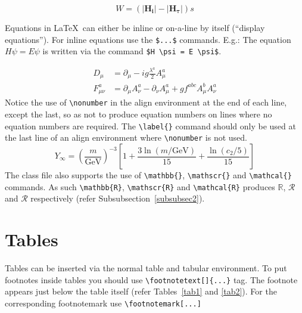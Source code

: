 \documentclass[sn-mathphys]{sn-jnl}%
\begin{document}
\begin{equation}
  W =   \left( \left| \boldsymbol{H_{i}} \right| - \left|  \boldsymbol{H_{\tau}} \right| \right)s  \label{cadentialGravityEq}
\end{equation}



Equations in \LaTeX\ can either be inline or on-a-line by itself (``display equations''). For
inline equations use the \verb+$...$+ commands. E.g.: The equation
$H\psi = E \psi$ is written via the command \verb+$H \psi = E \psi$+.

\begin{align}
D_\mu &=  \partial_\mu - ig \frac{\lambda^a}{2} A^a_\mu \nonumber \\
F^a_{\mu\nu} &= \partial_\mu A^a_\nu - \partial_\nu A^a_\mu + g f^{abc} A^b_\mu A^a_\nu \label{eq2}
\end{align}
Notice the use of \verb+\nonumber+ in the align environment at the end
of each line, except the last, so as not to produce equation numbers on
lines where no equation numbers are required. The \verb+\label{}+ command
should only be used at the last line of an align environment where
\verb+\nonumber+ is not used.
\begin{equation}
Y_\infty = \left( \frac{m}{\textrm{GeV}} \right)^{-3}
    \left[ 1 + \frac{3 \ln(m/\textrm{GeV})}{15}
    + \frac{\ln(c_2/5)}{15} \right]
\end{equation}
The class file also supports the use of \verb+\mathbb{}+, \verb+\mathscr{}+ and
\verb+\mathcal{}+ commands. As such \verb+\mathbb{R}+, \verb+\mathscr{R}+
and \verb+\mathcal{R}+ produces $\mathbb{R}$, $\mathscr{R}$ and $\mathcal{R}$
respectively (refer Subsubsection~\ref{subsubsec2}).

\section{Tables}\label{sec5}

Tables can be inserted via the normal table and tabular environment. To put
footnotes inside tables you should use \verb+\footnotetext[]{...}+ tag.
The footnote appears just below the table itself (refer Tables~\ref{tab1} and \ref{tab2}). 
For the corresponding footnotemark use \verb+\footnotemark[...]+
\end{document}
